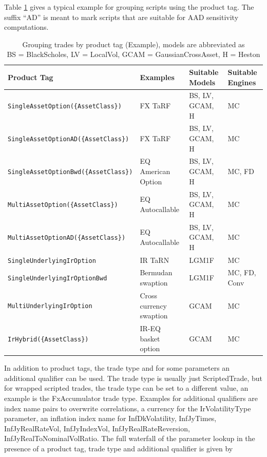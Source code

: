 Table \ref{tab:producttag} gives a typical example for grouping scripts using the product tag. The suffix ``AD'' is
meant to mark scripts that are suitable for AAD sensitivity computations.

\begin{table}[!htbp]
  \scriptsize
  \begin{tabular}{l | l | l | l}
    Product Tag & Examples & Suitable Models & Suitable Engines \\ \hline
    \verb+SingleAssetOption({AssetClass})+ & FX TaRF & BS, LV, GCAM, H & MC \\
    \verb+SingleAssetOptionAD({AssetClass})+ & FX TaRF & BS, LV, GCAM, H & MC \\
    \verb+SingleAssetOptionBwd({AssetClass})+ & EQ American Option & BS, LV, GCAM, H & MC, FD \\
    \verb+MultiAssetOption({AssetClass})+ & EQ Autocallable & BS, LV, GCAM, H & MC \\
    \verb+MultiAssetOptionAD({AssetClass})+ & EQ Autocallable & BS, LV, GCAM, H & MC \\
    \verb+SingleUnderlyingIrOption+ & IR TaRN & LGM1F & MC \\
    \verb+SingleUnderlyingIrOptionBwd+ & Bermudan swaption & LGM1F & MC, FD, Conv \\
    \verb+MultiUnderlyingIrOption+ & Cross currency swaption & GCAM & MC \\
    \verb+IrHybrid({AssetClass})+ & IR-EQ basket option & GCAM & MC \\
  \end{tabular}
  \caption{Grouping trades by product tag (Example), models are abbreviated as\\ BS = BlackScholes, LV = LocalVol, GCAM =
    GaussianCrossAsset, H = Heston}
  \label{tab:producttag}
\end{table}

In addition to product tags, the trade type and for some parameters an additional qualifier can be used. The trade type
is usually just ScriptedTrade, but for wrapped scripted trades, the trade type can be set to a different value, an
example is the FxAccumulator trade type. Examples for additional qualifiers are index name pairs to overwrite
correlations, a currency for the IrVolatilityType parameter, an inflation index name for InfDkVolatility, InfJyTimes,
InfJyRealRateVol, InfJyIndexVol, InfJyRealRateReversion, InfJyRealToNominalVolRatio. The full waterfall of the parameter
lookup in the presence of a product tag, trade type and additional qualifier is given by

